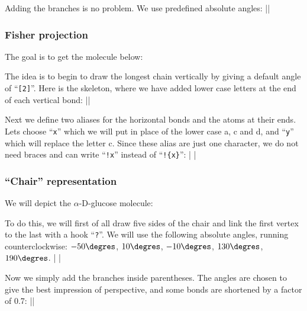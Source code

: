 \documentclass[10pt]{article}
\begin{document}
Adding the branches is no problem. We use predefined absolute angles:
||

\subsubsection{Fisher projection}
The goal is to get the molecule below:
\begin{center}
\end{center}
The idea is to begin to draw the longest chain vertically by giving a default angle of ``\verb-[2]-''. Here is the skeleton, where we have added lower case letters at the end of each vertical bond:
||

Next we define two aliases for the horizontal bonds and the atoms at their ends. Lets choose ``\verb-x-'' which we will put in place of the lower case a, c and d, and ``\verb-y-'' which will replace the letter c. Since these alias are just one character, we do not need braces and can write ``\verb-!x-'' instead of ``\verb-!{x}-'':
|
|

\subsubsection{``Chair'' representation}
We will depict the $\alpha$-D-glucose molecule:

To do this, we will first of all draw five sides of the chair and link the first vertex to the last with a hook ``\verb-?-''. We will use the following absolute angles, running counterclockwise: $-50\degres$, $10\degres$, $-10\degres$, $130\degres$, $190\degres$.
|
|

Now we simply add the branches inside parentheses. The angles are chosen to give the best impression of perspective, and some bonds are shortened by a factor of 0.7:
||
\end{document}
